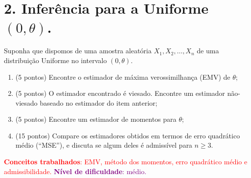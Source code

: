 \documentclass[a4paper,10pt, notitlepage]{report}
\newcommand{\rs}{X_1, X_2, \ldots, X_n} %
\begin{document}
\section*{2. Inferência para a Uniforme $(0, \theta)$.}
Suponha que dispomos de uma amostra aleatória $\rs$ de uma distribuição Uniforme no intervalo $(0, \theta)$.
\begin{enumerate}[label=\alph*)]
 \item (5 pontos) Encontre o estimador de máxima verossimilhança (EMV) de $\theta$;
 \item (5 pontos) O estimador encontrado é viesado.
 Encontre um estimador não-viesado baseado no estimador do item anterior;
 \item (5 pontos) Encontre um estimador de momentos para $\theta$;
 \item (15 pontos) Compare os estimadores obtidos em termos de erro quadrático médio (``MSE''), e discuta se algum deles é admissível para $n\geq 3$.
\end{enumerate}
\textcolor{red}{\textbf{Conceitos trabalhados}: EMV, método dos momentos,  erro quadrático médio e admissibilidade.} \textcolor{purple}{\textbf{Nível de dificuldade}: médio.}
\end{document}
